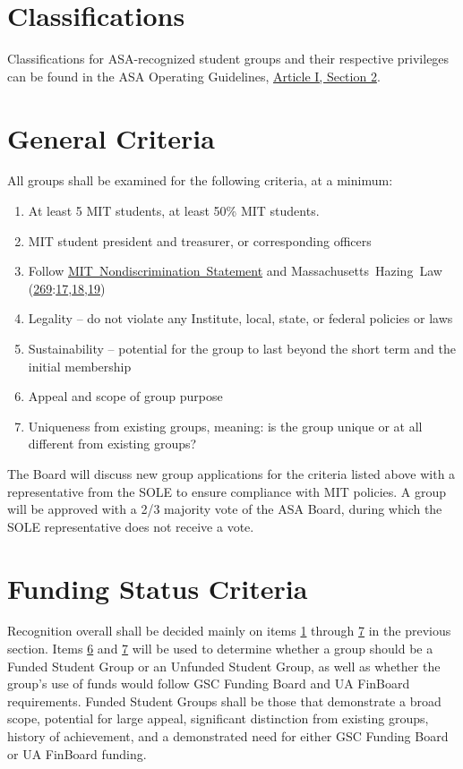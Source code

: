 \documentclass[12pt]{article}
\newcommand{\MHL}{%
    Massachusetts~Hazing~Law (\href{https://malegislature.gov/Laws/GeneralLaws/PartIV/TitleI/Chapter269}{269}:\href{https://malegislature.gov/Laws/GeneralLaws/PartIV/TitleI/Chapter269/Section17}{17},\href{https://malegislature.gov/Laws/GeneralLaws/PartIV/TitleI/Chapter269/Section18}{18},\href{https://malegislature.gov/Laws/GeneralLaws/PartIV/TitleI/Chapter269/Section19}{19})\xspace
}
\newcommand{\NDS}{\href{https://handbook.mit.edu/nondiscrimination}{MIT~Nondiscrimination~Statement}\xspace}
\begin{document}

\section{Classifications}
Classifications for ASA-recognized student groups and their respective privileges can be found in the ASA
Operating Guidelines, \hyperref[art:I_sect2]{Article I, Section 2}.

\section{General Criteria}
\label{app:B_artII_sect2}
All groups shall be examined for the following criteria, at a minimum:
\begin{enumerate}
    \item \label{app:B_artII_sect2_1} At least 5 MIT students, at least 50\% MIT students.
    \item MIT student president and treasurer, or corresponding officers
    \item Follow \NDS and \MHL
    \item Legality – do not violate any Institute, local, state, or federal policies or laws
    \item Sustainability – potential for the group to last beyond the short term and the initial membership
    \item \label{app:B_artII_sect2_6} Appeal and scope of group purpose
    \item \label{app:B_artII_sect2_7} Uniqueness from existing groups, meaning: is the group unique or at all different from
existing groups?
\end{enumerate}
The Board will discuss new group applications for the criteria listed above with a representative
from the SOLE to ensure compliance with MIT policies. A group will be approved with a 2/3
majority vote of the ASA Board, during which the SOLE representative does not receive a vote.

\section{Funding Status Criteria}
Recognition overall shall be decided mainly on items \hyperref[app:B_artII_sect2_1]{1} through \hyperref[app:B_artII_sect2_7]{7} in the previous section. Items \hyperref[app:B_artII_sect2_6]{6} and
\hyperref[app:B_artII_sect2_7]{7} will be used to determine whether a group should be a Funded Student Group or an Unfunded
Student Group, as well as whether the group’s use of funds would follow GSC Funding Board and UA
FinBoard requirements. Funded Student Groups shall be those that demonstrate a broad scope,
potential for large appeal, significant distinction from existing groups, history of achievement, and a
demonstrated need for either GSC Funding Board or UA FinBoard funding.
\end{document}
